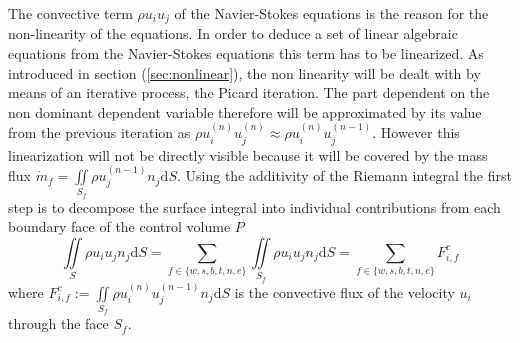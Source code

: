       The convective term \(\rho u_i u_j\) of the Navier-Stokes equations is the reason for the non-linearity of the equations. In order to deduce a set of linear algebraic equations from the Navier-Stokes equations this term has to be linearized. As introduced in section (\ref{sec:nonlinear}), the non linearity will be dealt with by means of an iterative process, the Picard iteration. The part dependent on the non dominant dependent variable therefore will be approximated by its value from the previous iteration as \( \rho u_i^{(n)} u_j^{(n)} \approx \rho u_i^{(n)} u_j^{(n-1)} \). However this linearization will not be directly visible because it will be covered by the mass flux \(\dot{m}_f = \iint\limits_{S_f} \rho u_j^{(n-1)} n_j \mathrm{d}S \). Using the additivity of the Riemann integral the first step is to decompose the surface integral into individual contributions from each boundary face of the control volume \(P\)
      \begin{displaymath}
      \iint\limits_S \rho u_i u_jn_j \mathrm{d}S
      = \sum_{f \in \{w,s,b,t,n,e\}} \iint\limits_{S_f}\rho u_{i} u_{j} n_{j} \mathrm{d}S
      = \sum_{f \in \{w,s,b,t,n,e\}} F_{i,f}^{c}
      \end{displaymath}
      where \(F_{i,f}^c := \iint\limits_{S_f} \rho u_{i}^{(n)} u_{j}^{(n-1)} n_{j} \mathrm{d}S \) is the convective flux of the velocity \(u_i\) through the face \(S_f\). 
      
